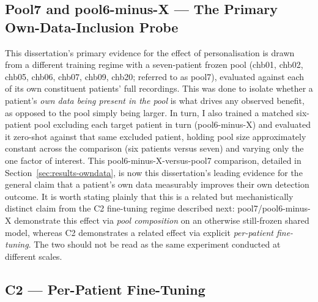 \subsection{Pool7 and pool6-minus-X --- The Primary Own-Data-Inclusion Probe}

This dissertation's primary evidence for the effect of personalisation is drawn from a different training regime with a seven-patient frozen pool 
(chb01, chb02, chb05, chb06, chb07, chb09, chb20; referred to as pool7), evaluated against each of its own constituent patients' full recordings. This was done to isolate whether a 
patient's \emph{own data being present in the pool} is what drives any observed benefit, as opposed to the pool simply being larger. In turn, I also trained a matched six-patient 
pool excluding each target patient in turn (pool6-minus-X) and evaluated it zero-shot against that same excluded patient, holding pool size approximately constant across the comparison
(six patients versus seven) and varying only the one factor of interest. This pool6-minus-X-versus-pool7 comparison, detailed in Section~\ref{sec:results-owndata}, is now this 
dissertation's leading evidence for the general claim that a patient's own data measurably improves their own detection outcome. It is worth stating plainly that this is a related but 
mechanistically distinct claim from the C2 fine-tuning regime described next: pool7/pool6-minus-X demonstrate this effect via \emph{pool composition} on an otherwise still-frozen shared 
model, whereas C2 demonstrates a related effect via explicit \emph{per-patient fine-tuning}. The two should not be read as the same experiment conducted at different scales.

\subsection{C2 --- Per-Patient Fine-Tuning}

